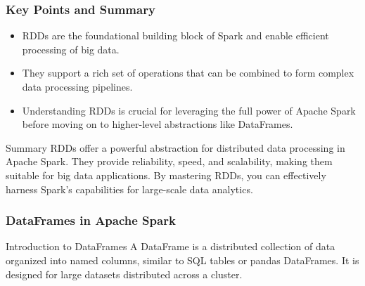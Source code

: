 \documentclass[aspectratio=169]{beamer}
\begin{document}
\begin{frame}[fragile]
    \frametitle{Key Points and Summary}
    \begin{itemize}
        \item RDDs are the foundational building block of Spark and enable efficient processing of big data.
        \item They support a rich set of operations that can be combined to form complex data processing pipelines.
        \item Understanding RDDs is crucial for leveraging the full power of Apache Spark before moving on to higher-level abstractions like DataFrames.
    \end{itemize}
    
    \begin{block}{Summary}
        RDDs offer a powerful abstraction for distributed data processing in Apache Spark. They provide reliability, speed, and scalability, making them suitable for big data applications. By mastering RDDs, you can effectively harness Spark’s capabilities for large-scale data analytics.
    \end{block}
\end{frame}

\begin{frame}
    \frametitle{DataFrames in Apache Spark}
    \begin{block}{Introduction to DataFrames}
        A DataFrame is a distributed collection of data organized into named columns, similar to SQL tables or pandas DataFrames. It is designed for large datasets distributed across a cluster.
    \end{block}
\end{frame}
\end{document}
